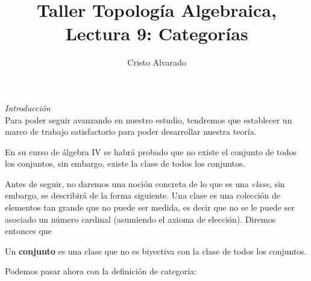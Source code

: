 \documentclass{article}
\newcounter{it}
\theoremstyle{largebreak}
\newcommand\subtitle[1]{\textit{\large #1}\\}
\begin{document}
    \title{Taller Topología Algebraica, Lectura 9: Categorías}
    \author{Cristo Alvarado}
    \setcounter{section}{9}
    \maketitle

    \subtitle{Introducción}

    Para poder seguir avanzando en nuestro estudio, tendremos que establecer un marco de trabajo satisfactorio para poder desarrollar nuestra teoría.

    \begin{obs}
        En su curso de álgebra IV se habrá probado que no existe el conjunto de todos los conjuntos, sin embargo, existe la clase de todos los conjuntos.
    \end{obs}

    Antes de seguir, no daremos una noción concreta de lo que es una \textit{clase}, sin embargo, se describirá de la forma siguiente. Una clase es una colección de elementos tan grande que no puede ser medida, es decir que no se le puede ser asociado un número cardinal (asumiendo el axioma de elección). Diremos entonces que

    \begin{mydef}
        Un \textbf{conjunto} es una clase que no es biyectiva con la clase de todos los conjuntos.
    \end{mydef}

    Podemos pasar ahora con la definición de categoría:
\end{document}
